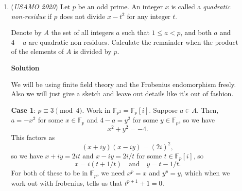 \begin{enumerate}
 Similarly from $xz$ and $yz$ face perspective, it also needs $2020$ and $2020$ beams.

 Consider one beam has four $1 \times 2020$ faces and it can be counted twice. So there should be at least $2020 \times 3 \div 2=3030$ beams.

 Here is one solution with 3030 beams.

 $(x, 1, 1),\ (y, 1, 2),\ (z, 2, 2),$
$\cdots ,$
$(x, (2n+1), (2n+1)),\ (y, (2n+1), (2n+2)),\ (z, (2n+2), (2n+2)),$
$\cdots ,$
$(x, (2019, 2019)),\ (y, 2019, 2020),\ (z, 2020, 2020)$



	\item (\textit{USAMO 2020}) Let $p$ be an odd prime. An integer $x$ is called a \textit{quadratic non-residue} if $p$ does not divide $x - t^2$ for any integer $t$.


 Denote by $A$ the set of all integers $a$ such that $1 \le a < p$, and both $a$ and $4 - a$ are quadratic non-residues. Calculate the remainder when the product of the elements of $A$ is divided by $p$.


 



 



\textbf{Solution}

We will be using finite field theory and the Frobenius endomorphism freely. Also we will just give a sketch and leave out details like it's out of fashion.

 \textbf{Case 1}: $p\equiv 3\pmod{4}$. Work in $\mathbb{F}_{p^2} = \mathbb{F}_p[i]$. Suppose $a\in A$. Then, $a=-x^2$ for some $x\in\mathbb{F}_p$ and $4-a=y^2$ for some $y\in\mathbb{F}_p$, so we have 
 \[x^2+y^2 = -4.\] This factors as 
 \[(x+iy)(x-iy) = (2i)^2,\] so we have $x+iy=2it$ and $x-iy=2i/t$ for some $t\in\mathbb{F}_p[i]$, so 
 \[x=i(t+1/t)\quad\text{and}\quad y=t-1/t.\] For both of these to be in $\mathbb{F}_p$, we need $x^p=x$ and $y^p=y$, which when we work out with frobenius, tells us that $t^{p+1}+1=0$.


\end{enumerate}

